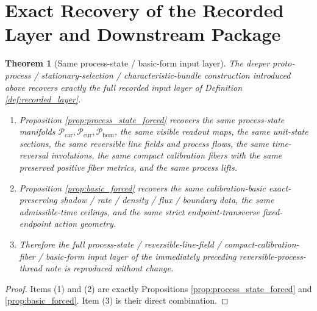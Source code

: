 \documentclass[11pt]{article}
\newcommand{\TensorProcSpace}{\mathcal P_{\mathrm{car}}}
\newcommand{\CurProcSpace}{\mathcal P_{\mathrm{cur}}}
\newcommand{\HomProcSpace}{\mathcal P_{\mathrm{hom}}}
\newtheorem{theorem}{Theorem}
\begin{document}
\section{Exact Recovery of the Recorded Layer and Downstream Package}

\begin{theorem}[Same process-state / basic-form input layer]
\label{thm:same_input}
The deeper proto-process / stationary-selection / characteristic-bundle construction introduced above recovers exactly the full recorded input layer of Definition \ref{def:recorded_layer}.
\begin{enumerate}
    \item Proposition \ref{prop:process_state_forced} recovers the same process-state manifolds \(\TensorProcSpace,\CurProcSpace,\HomProcSpace\), the same visible readout maps, the same unit-state sections, the same reversible line fields and process flows, the same time-reversal involutions, the same compact calibration fibers with the same preserved positive fiber metrics, and the same process lifts.
    \item Proposition \ref{prop:basic_forced} recovers the same calibration-basic exact-preserving shadow / rate / density / flux / boundary data, the same admissible-time ceilings, and the same strict endpoint-transverse fixed-endpoint action geometry.
    \item Therefore the full process-state / reversible-line-field / compact-calibration-fiber / basic-form input layer of the immediately preceding reversible-process-thread note is reproduced without change.
\end{enumerate}
\end{theorem}

\begin{proof}
Items (1) and (2) are exactly Propositions \ref{prop:process_state_forced} and \ref{prop:basic_forced}. Item (3) is their direct combination.
\end{proof}
\end{document}
